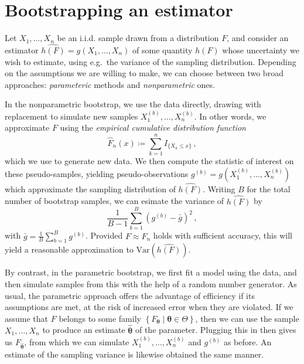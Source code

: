 \documentclass[a4paper]{book}
\begin{document}
\section{Bootstrapping an estimator}

Let $X_1, \dots, X_n$ be an i.i.d. sample drawn from a distribution $F$, and consider an estimator $\widehat{h(F)} = g(X_1, \dots, X_n)$ of some quantity $h(F)$ whose uncertainty we wish to estimate, using e.g.\ the variance of the sampling distribution. Depending on the assumptions we are willing to make, we can choose between two broad approaches: \emph{parameteric} methods and \emph{nonparametric} ones.

In the nonparametric bootstrap, we use the data directly, drawing with replacement to simulate new samples $X^{(b)}_1, \dots, X^{(b)}_n$. In other words, we approximate $F$ using the \emph{empirical cumulative distribution function}
\begin{equation}
    \widehat{F}_n(x) \coloneqq \sum_{k=1}^n I_{\{ X_k \leq x \}} \,,
\end{equation}
which we use to generate new data. We then compute the statistic of interest on these pseudo-samples, yielding pseudo-observations $g^{(b)} = g(X^{(b)}_1, \dots, X^{(b)}_n)$ which approximate the sampling distribution of $\widehat{h(F)}$. Writing $B$ for the total number of bootstrap samples, we can esimate the variance of $\widehat{h(F)}$ by
\begin{equation}
    \frac{1}{B-1}\sum_{b=1}^B(g^{(b)} - \bar{g})^2 \,,
\end{equation}
with $\bar{g} = \frac{1}{B} \sum_{b=1}^B g^{(b)}$. Provided $F \approx \widehat{F}_n$ holds with sufficient accuracy, this will yield a reasonable approximation to $\mathrm{Var}(\widehat{h(F)})$.

By contrast, in the parametric bootstrap, we first fit a model using the data, and then simulate samples from this with the help of a random number generator. As usual, the parametric approach offers the advantage of efficiency if its assumptions are met, at the risk of increased error when they are violated. If we assume that $F$ belongs to some family $\left \{ F_{\bm{\theta}} \mid  \bm{\theta} \in \Theta \right \}$, then we can use the sample $X_1, \dots, X_n$ to produce an estimate $\bm{\widehat{\theta}}$ of the parameter. Plugging this in then gives us $F_{\bm{\widehat{\theta}}}$, from which we can simulate $X^{(b)}_1, \dots , X^{(b)}_n$ and $g^{(b)}$ as before. An estimate of the sampling variance is likewise obtained the same manner.
\end{document}
